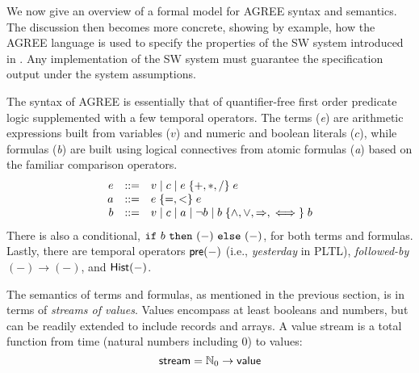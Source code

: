 \begin{comment}
This section gives an abstract mathematical overview of AGREE's
compositional reasoning system, defining assume-guarantee contracts
and the verification conditions that AGREE checks in order to
modularly establish overall system correctness at the model level.
The syntax and semantics of AGREE are sketched in some detail.  The
discussion then becomes more concrete, showing---by example---how the
AGREE contract language is used to specify the cyber-hardened system
of \figref{fig:hardened}. The discussion proceeds from the
system-level contract to the filter and monitor components, which rely
on the notion of a \emph{code contract} to support code generation.
\end{comment}


We now give an overview of a formal model for AGREE syntax and semantics.
The discussion then becomes more concrete, showing by example, how the AGREE language is used to specify the properties of the SW system introduced in .
Any implementation of the SW system must guarantee the specification output under the system assumptions.

The syntax of AGREE is
essentially that of quantifier-free first order predicate logic
supplemented with a few temporal operators. The terms (\emph{e}) are
arithmetic expressions built from variables ($v$) and numeric and
boolean literals ($c$), while formulas (\emph{b}) are built using
logical connectives from atomic formulas (\emph{a}) based on the
familiar comparison operators.
\[
\begin{array}{rcl}
e & ::= & v \mid c \mid e \;\{ {+,*,/} \}\; e \\
a & ::= & e\; \{ {=,<} \}\; e \\
b & ::= & v \mid c \mid a \mid \neg b
            \mid b \; \{ {\land,\lor,\Rightarrow,\iff} \}\; b
\end{array}
\]
There is also a conditional, $\mbox{$\mathtt{if}\ {b}\ \mathtt{then}\ {(-)}\ \mathtt{else}\ {(-)}$}$, for both terms
and formulas. Lastly, there are temporal operators $\mathsf{pre}(-)$ (i.e., \emph{yesterday} in PLTL),
\emph{followed-by} $(-) \to (-)$, and $\mathsf{Hist}(-)$.

The semantics of terms and formulas, as mentioned in the previous section, is in terms of \emph{streams of
values}. Values encompass at least booleans and numbers, but can be
readily extended to include records and arrays. A value stream is a
total function from time (natural numbers including 0) to values:
\[
 \mathsf{stream} = \mathbb{N}_0 \to \mathsf{value}
\]

